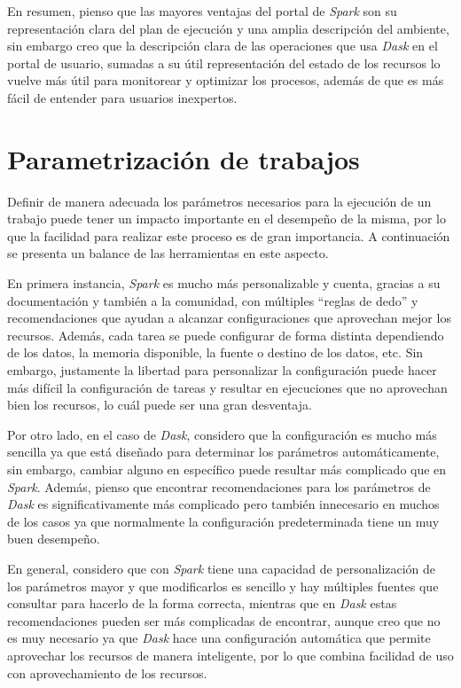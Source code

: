 En resumen, pienso que las mayores ventajas del portal de \textit{Spark} son su representación clara del plan de ejecución y una amplia descripción del ambiente, sin embargo creo que la descripción clara de las operaciones que usa \textit{Dask} en el portal de usuario, sumadas a su útil representación del estado de los recursos lo vuelve más útil para monitorear y optimizar los procesos, además de que es más fácil de entender para usuarios inexpertos.


\section{Parametrización de trabajos}

Definir de manera adecuada los parámetros necesarios para la ejecución de un trabajo puede tener un impacto importante en el desempeño de la misma, por lo que la facilidad para realizar este proceso es de gran importancia. A continuación se presenta un balance de las herramientas en este aspecto.

En primera instancia, \textit{Spark} es mucho más personalizable y cuenta, gracias a su documentación y también a la comunidad, con múltiples ``reglas de dedo'' y recomendaciones que ayudan a alcanzar configuraciones que aprovechan mejor los recursos. Además, cada tarea se puede configurar de forma distinta dependiendo de los datos, la memoria disponible, la fuente o destino de los datos, etc. Sin embargo, justamente la libertad para personalizar la configuración puede hacer más difícil la configuración de tareas y resultar en ejecuciones que no aprovechan bien los recursos, lo cuál puede ser una gran desventaja.

Por otro lado, en el caso de \textit{Dask}, considero que la configuración es mucho más sencilla ya que está diseñado para determinar los parámetros automáticamente, sin embargo, cambiar alguno en específico puede resultar más complicado que en \textit{Spark}. Además, pienso que encontrar recomendaciones para los parámetros de \textit{Dask} es significativamente más complicado pero también innecesario en muchos de los casos ya que normalmente la configuración predeterminada tiene un muy buen desempeño.

En general, considero que con \textit{Spark} tiene una capacidad de personalización de los parámetros mayor y que modificarlos es sencillo y hay múltiples fuentes que consultar para hacerlo de la forma correcta, mientras que en \textit{Dask} estas recomendaciones pueden ser más complicadas de encontrar, aunque creo que no es muy necesario ya que \textit{Dask} hace una configuración automática que permite aprovechar los recursos de manera inteligente, por lo que combina facilidad de uso con aprovechamiento de los recursos.

